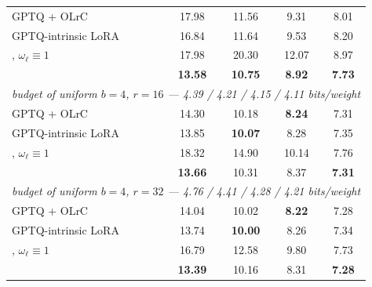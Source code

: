 \begin{table}[H]
\begin{tabular}{lcccc}
\quad GPTQ + OLrC & 17.98 & 11.56 & 9.31 & 8.01 \\
\quad GPTQ-intrinsic LoRA & 16.84 & 11.64 & 9.53 & 8.20 \\
\quad \method{}, $\omega_\ell \equiv 1$ & 17.98 & 20.30 & 12.07 & 8.97 \\
\quad \method{} & \textbf{13.58} & \textbf{10.75} & \textbf{8.92} & \textbf{7.73} \\
\midrule
\multicolumn{5}{l}{\emph{budget of uniform $b=4$, $r=16$ --- 4.39 / 4.21 / 4.15 / 4.11 bits/weight}} \\
\quad GPTQ + OLrC & 14.30 & 10.18 & \textbf{8.24} & 7.31 \\
\quad GPTQ-intrinsic LoRA & 13.85 & \textbf{10.07} & 8.28 & 7.35 \\
\quad \method{}, $\omega_\ell \equiv 1$ & 18.32 & 14.90 & 10.14 & 7.76 \\
\quad \method{} & \textbf{13.66} & 10.31 & 8.37 & \textbf{7.31} \\
\midrule
\multicolumn{5}{l}{\emph{budget of uniform $b=4$, $r=32$ --- 4.76 / 4.41 / 4.28 / 4.21 bits/weight}} \\
\quad GPTQ + OLrC & 14.04 & 10.02 & \textbf{8.22} & 7.28 \\
\quad GPTQ-intrinsic LoRA & 13.74 & \textbf{10.00} & 8.26 & 7.34 \\
\quad \method{}, $\omega_\ell \equiv 1$ & 16.79 & 12.58 & 9.80 & 7.73 \\
\quad \method{} & \textbf{13.39} & 10.16 & 8.31 & \textbf{7.28} \\
\bottomrule
\end{tabular}
\end{table}
